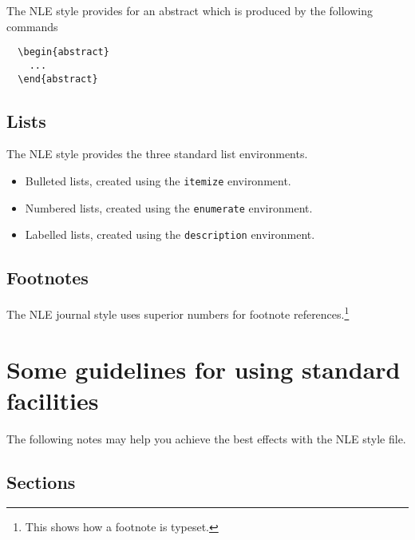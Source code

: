 \documentclass{cnle}
\begin{document}
The NLE style provides for an abstract which is produced by the following
commands
%
\begin{verbatim}
  \begin{abstract}
    ...
  \end{abstract}
\end{verbatim}

\subsection{Lists}

The NLE style provides the three standard list environments.
\begin{itemize}
  \item Bulleted lists, created using the \verb"itemize" environment.
  \item Numbered lists, created using the \verb"enumerate" environment.
  \item Labelled lists, created using the \verb"description" environment.
\end{itemize}

\subsection{Footnotes}

The NLE journal style uses superior numbers for footnote
references.\footnote{This shows how a footnote is typeset.}

\section{Some guidelines for using standard facilities}

The following notes may help you achieve the best effects with the NLE style
file.

\subsection{Sections}
\end{document}
